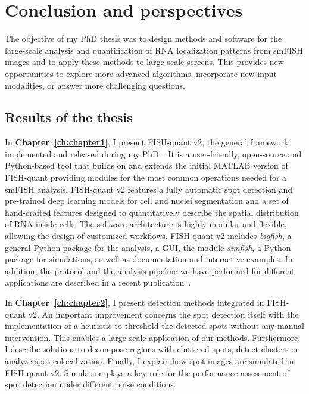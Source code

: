 
\chapter{Conclusion and perspectives}
\label{ch:conclusion}

\minitoc
\newpage

The objective of my PhD thesis was to design methods and software for the large-scale analysis and quantification of \ac{RNA} localization patterns from \ac{smFISH} images and to apply these methods to large-scale screens.
This provides new opportunities to explore more advanced algorithms, incorporate new input modalities, or answer more challenging questions.

\section{Results of the thesis}
\label{sec:conclusion_thesis}

In \textbf{Chapter~\ref{ch:chapter1}}, I present FISH-quant v2, the general framework implemented and released during my PhD~\cite{Imbert_fq_2022}.
It is a user-friendly, open-source and Python-based tool that builds on and extends the initial MATLAB version of FISH-quant providing modules for the most common operations needed for a \ac{smFISH} analysis.
FISH-quant v2 features a fully automatic spot detection and pre-trained deep learning models for cell and nuclei segmentation and a set of hand-crafted features designed to quantitatively describe the spatial distribution of \ac{RNA} inside cells.
The software architecture is highly modular and flexible, allowing the design of customized workflows.
FISH-quant v2 includes \emph{bigfish}, a general Python package for the analysis, a \ac{GUI}, the module \emph{simfish}, a Python package for simulations, as well as documentation and interactive examples.
In addition, the protocol and the analysis pipeline we have performed for different applications are described in a recent publication~\cite{safieddine_ht_smfish_2022}.

In \textbf{Chapter~\ref{ch:chapter2}}, I present detection methods integrated in FISH-quant v2.
An important improvement concerns the spot detection itself with the implementation of a heuristic to threshold the detected spots without any manual intervention.
This enables a large scale application of our methods.
Furthermore, I describe solutions to decompose regions with cluttered spots, detect clusters or analyze spot colocalization.
Finally, I explain how spot images are simulated in FISH-quant v2.
Simulation plays a key role for the performance assessment of spot detection under different noise conditions.

